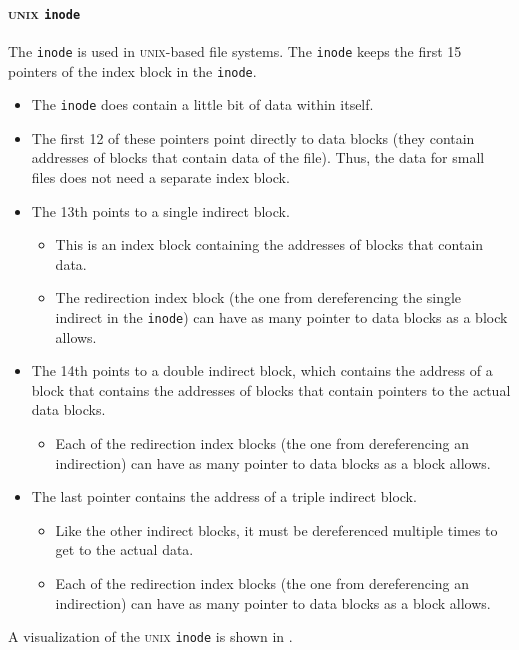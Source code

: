 \paragraph{\textsc{unix} \texttt{inode}}\label{par:Inode}
The \texttt{inode} is used in \textsc{unix}-based file systems.
The \texttt{inode} keeps the first 15 pointers of the index block in the \texttt{inode}.
\begin{itemize}[noitemsep]
\item The \texttt{inode} does contain a little bit of data within itself.
\item The first 12 of these pointers point directly to data blocks (they contain addresses of blocks that contain data of the file).
  Thus, the data for small files does not need a separate index block.
\item The 13th points to a single indirect block.
  \begin{itemize}[noitemsep]
  \item This is an index block containing the addresses of blocks that contain data.
  \item The redirection index block (the one from dereferencing the single indirect in the \texttt{inode}) can have as many pointer to data blocks as a block allows.
\end{itemize}

\item The 14th points to a double indirect block, which contains the address of a block that contains the addresses of blocks that contain pointers to the actual data blocks.
  \begin{itemize}[noitemsep]
  \item Each of the redirection index blocks (the one from dereferencing an indirection) can have as many pointer to data blocks as a block allows.
  \end{itemize}
\item The last pointer contains the address of a triple indirect block.
  \begin{itemize}[noitemsep]
  \item Like the other indirect blocks, it must be dereferenced multiple times to get to the actual data.
  \item Each of the redirection index blocks (the one from dereferencing an indirection) can have as many pointer to data blocks as a block allows.
  \end{itemize}
\end{itemize}

A visualization of the \textsc{unix} \texttt{inode} is shown in .


